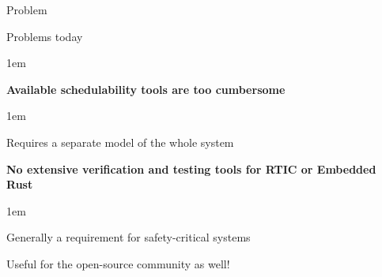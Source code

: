 \begin{frame}{Problem}
    \begin{block}{Problems today}
        \begin{itemize-size}{1em}
            \item \textbf{Available schedulability tools are too cumbersome}
                \begin{itemize-size}{1em}
                    \item Requires a separate model of the whole system
                \end{itemize-size}
            \item \textbf{No extensive verification and testing tools for RTIC or Embedded Rust}
                \begin{itemize-size}{1em}
                    \item Generally a requirement for safety-critical systems
                    \item Useful for the open-source community as well!
                \end{itemize-size}
        \end{itemize-size}
    \end{block}
\end{frame}
